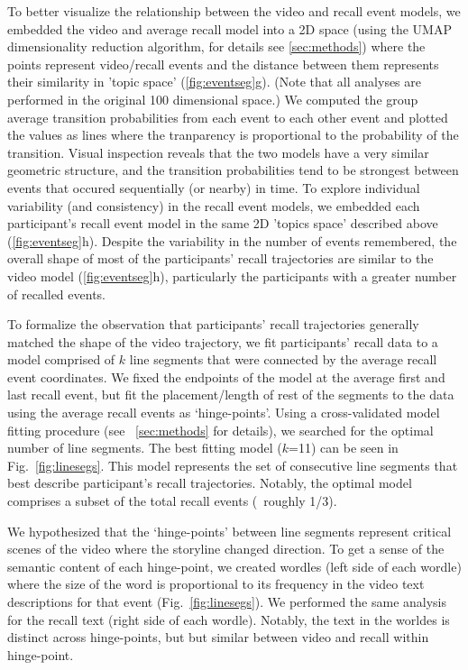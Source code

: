 \documentclass{article}
\begin{document}
{To better visualize the relationship between the video and recall event models, we embedded the video and average recall model into a 2D space (using the UMAP dimensionality reduction algorithm, for details see \ref{sec:methods}) where the points represent video/recall events and the distance between them represents their similarity in 'topic space' (\ref{fig:eventseg}g). (Note that all analyses are performed in the original 100 dimensional space.) We computed the group average transition probabilities from each event to each other event and plotted the values as lines where the tranparency is proportional to the probability of the transition.  Visual inspection reveals that the two models have a very similar geometric structure, and the transition probabilities tend to be strongest between events that occured sequentially (or nearby) in time. To explore individual variability (and consistency) in the recall event models, we embedded each participant's recall event model in the same 2D 'topics space' described above (\ref{fig:eventseg}h). Despite the variability in the number of events remembered, the overall shape of most of the participants' recall trajectories are similar to the video model (\ref{fig:eventseg}h), particularly the participants with a greater number of recalled events.

To formalize the observation that participants' recall trajectories generally matched the shape of the video trajectory, we fit participants' recall data to a model comprised of $k$ line segments that were connected by the average recall event coordinates. We fixed the endpoints of the model at the average first and last recall event, but fit the placement/length of rest of the segments to the data using the average recall events as `hinge-points'. Using a cross-validated model fitting procedure (see ~\ref{sec:methods} for details), we searched for the optimal number of line segments. The best fitting model ($k$=11) can be seen in Fig.~\ref{fig:linesegs}. This model represents the set of consecutive line segments that best describe participant's recall trajectories. Notably, the optimal model comprises a subset of the total recall events (~roughly 1/3).

We hypothesized that the `hinge-points' between line segments represent critical scenes of the video where the storyline changed direction. To get a sense of the semantic content of each hinge-point, we created wordles (left side of each wordle) where the size of the word is proportional to its frequency in the video text descriptions for that event (Fig.~\ref{fig:linesegs}). We performed the same analysis for the recall text (right side of each wordle).  Notably, the text in the worldes is distinct across hinge-points, but but similar between video and recall within hinge-point.

}
\end{document}
